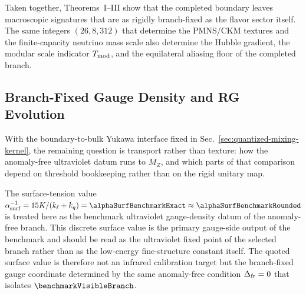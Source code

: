 \documentclass[11pt]{article}
\begin{document}
Taken together, Theorems~I--III show that the completed boundary leaves
macroscopic signatures that are as rigidly branch-fixed as the flavor sector
itself. The same integers $(26,8,312)$ that determine the PMNS/CKM textures and
the finite-capacity neutrino mass scale also determine the Hubble gradient, the
modular scale indicator $T_{\rm mod}$, and the equilateral aliasing floor of the
completed branch.

\subsection{Branch-Fixed Gauge Density and RG Evolution}\label{sec:branch-fixed-gauge-rg}

With the boundary-to-bulk Yukawa interface fixed in Sec.~\ref{sec:quantized-mixing-kernel}, the remaining question is transport rather than texture: how the anomaly-free ultraviolet datum runs to $M_Z$, and which parts of that comparison depend on threshold bookkeeping rather than on the rigid unitary map.

The surface-tension value $\alpha^{-1}_{\rm surf}=15K/(k_{\ell}+k_q)=\alphaSurfBenchmarkExact\approx\alphaSurfBenchmarkRounded$ is treated here as the benchmark ultraviolet gauge-density datum of the anomaly-free branch. This discrete surface value is the primary gauge-side output of the benchmark and should be read as the ultraviolet fixed point of the selected branch rather than as the low-energy fine-structure constant itself. The quoted surface value is therefore not an infrared calibration target but the branch-fixed gauge coordinate determined by the same anomaly-free condition $\Delta_{\rm fr}=0$ that isolates $\benchmarkVisibleBranch$.
\end{document}
